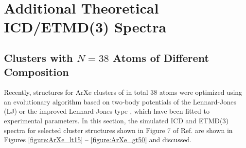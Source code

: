 \section{Additional Theoretical ICD/ETMD(3) Spectra}

\subsection{Clusters with $N=38$ Atoms of Different Composition}
Recently, structures for ArXe clusters of in total 38 atoms were optimized
using an evolutionary algorithm based on two-body potentials of the
Lennard-Jones (LJ) or the improved Lennard-Jones type \cite{marques,Pirani08},
which have been fitted to experimental parameters.
In this section, the simulated ICD and ETMD(3) spectra for selected cluster
structures shown in Figure 7 of Ref.  are shown in Figures
\ref{figure:ArXe_lt15} -- \ref{figure:ArXe_gt50} and discussed.


